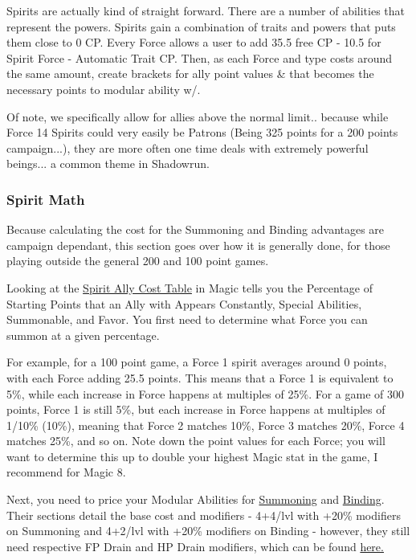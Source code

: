 \begin{multicols*}{2}
	Spirits are actually kind of straight forward. There are a number of abilities that represent the powers. Spirits gain a combination of traits and powers that puts them close to 0 CP. Every Force allows a user to add 35.5 free CP - 10.5 for Spirit Force - Automatic Trait CP.  Then, as each Force and type costs around the same amount, create brackets for ally point values \& that becomes the necessary points to modular ability w/.
	
	Of note, we specifically allow for allies above the normal limit.. because while Force 14 Spirits could very easily be Patrons (Being 325 points for a 200 points campaign...), they are more often one time deals with extremely powerful beings... a common theme in Shadowrun.
	
	\subsubsection{Spirit Math}\label{spirit_math}
	
	Because calculating the cost for the Summoning and Binding advantages are campaign dependant, this section goes over how it is generally done, for those playing outside the general 200 and 100 point games.
	
	Looking at the \hyperref[spirit_ally_cost]{Spirit Ally Cost Table} in Magic tells you the Percentage of Starting Points that an Ally with Appears Constantly, Special Abilities, Summonable, and Favor. You first need to determine what Force you can summon at a given percentage.
	
	For example, for a 100 point game, a Force 1 spirit averages around 0 points, with each Force adding 25.5 points. This means that a Force 1 is equivalent to 5\%, while each increase in Force happens at multiples of 25\%. For a game of 300 points, Force 1 is still 5\%, but each increase in Force happens at multiples of 1/10\% (10\%), meaning that Force 2 matches 10\%, Force 3 matches 20\%, Force 4 matches 25\%, and so on. Note down the point values for each Force; you will want to determine this up to double your highest Magic stat in the game, I recommend for Magic 8.
	
	Next, you need to price your Modular Abilities for \hyperref[summoning]{Summoning} and \hyperref[binding]{Binding}. Their sections detail the base cost and modifiers - 4+4/lvl with +20\% modifiers on Summoning and 4+2/lvl with +20\% modifiers on Binding - however, they still need respective FP Drain and HP Drain modifiers, which can be found \hyperref[drain_mods]{here.}
	

\end{multicols*}
